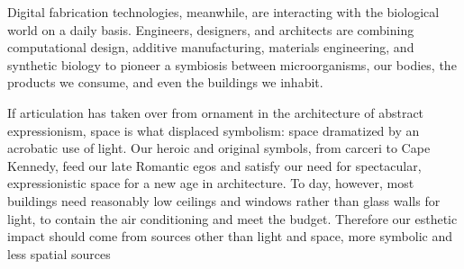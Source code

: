 


Digital fabrication technologies, meanwhile, are interacting with the biological world on a daily basis.
Engineers, designers, and architects are combining computational design, additive manufacturing, materials engineering, and synthetic biology to pioneer a symbiosis between microorganisms, our bodies, the products we consume, and even the buildings we inhabit\cite{Schwab2016}.


 If articulation has taken over from ornament in the architecture of abstract expressionism, space is what displaced symbolism: space dramatized by an acrobatic use of light. Our heroic and original symbols, from carceri to Cape Kennedy, feed our late Romantic egos and satisfy our need for spectacular, expressionistic space for a new age in architecture. To day, however, most buildings need reasonably low ceilings and windows rather than glass walls for light, to contain the air conditioning and meet the budget. Therefore our esthetic impact should come from sources other than light and space, more symbolic and less spatial sources\cite{}
